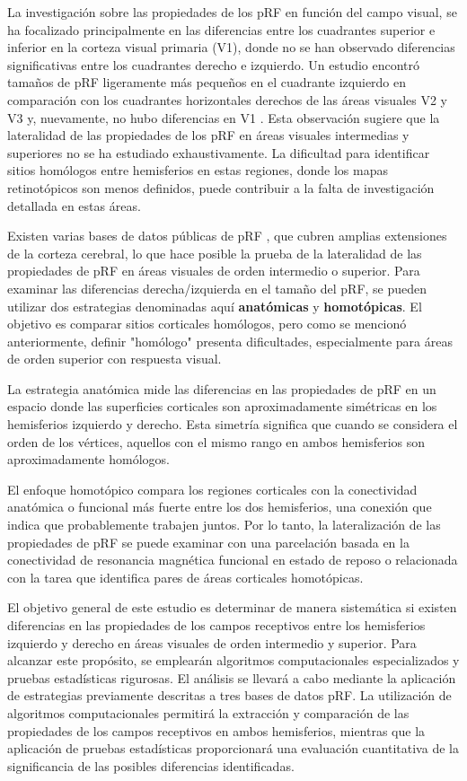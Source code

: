 \documentclass{article}
\begin{document}
	La investigación sobre las propiedades de los pRF en funci\'on del campo visual, se ha focalizado principalmente en las diferencias entre los cuadrantes superior e inferior en la corteza visual primaria (V1), donde no se han observado diferencias significativas entre los cuadrantes derecho e izquierdo. Un estudio encontró tamaños de pRF ligeramente más pequeños en el cuadrante izquierdo en comparación con los cuadrantes horizontales derechos de las \'areas visuales V2 y V3 y, nuevamente, no hubo diferencias en V1 \cite{silva_radial_2018}. Esta observación sugiere que la lateralidad de las propiedades de los pRF en áreas visuales intermedias y superiores no se ha estudiado exhaustivamente. La dificultad para identificar sitios homólogos entre hemisferios en estas regiones, donde los mapas retinotópicos son menos definidos, puede contribuir a la falta de investigación detallada en estas áreas.
			
	Existen varias bases de datos p\'ublicas de pRF \cite{benson_bayesian_2018,himmelberg_cross-dataset_2021}, que cubren amplias extensiones de la corteza cerebral, lo que hace posible la prueba de la lateralidad de las propiedades de pRF en \'areas visuales de orden intermedio o superior. Para examinar las diferencias derecha/izquierda en el tamaño del pRF, se pueden utilizar dos estrategias denominadas aquí \textbf{anatómicas} y \textbf{homotópicas}. El objetivo es comparar sitios corticales homólogos, pero como se mencionó anteriormente, definir "homólogo" presenta dificultades, especialmente para áreas de orden superior con respuesta visual.
	
	La estrategia anatómica mide las diferencias en las propiedades de pRF en un espacio donde las superficies corticales son aproximadamente simétricas en los hemisferios izquierdo y derecho. Esta simetría significa que cuando se considera el orden de los vértices, aquellos con el mismo rango en ambos hemisferios son aproximadamente homólogos.
	
	 El enfoque homotópico compara los regiones corticales con la conectividad anatómica o funcional más fuerte entre los dos hemisferios, una conexión que indica que probablemente trabajen juntos. Por lo tanto, la lateralización de las propiedades de pRF se puede examinar con una parcelación basada en la conectividad de resonancia magnética funcional en estado de reposo o relacionada con la tarea que identifica pares de áreas corticales homotópicas.  
	
	El objetivo general de este estudio es determinar de manera sistemática si existen diferencias en las propiedades de los campos receptivos entre los hemisferios izquierdo y derecho en áreas visuales de orden intermedio y superior. Para alcanzar este propósito, se emplearán algoritmos computacionales especializados y pruebas estadísticas rigurosas. El análisis se llevará a cabo mediante la aplicación de estrategias previamente descritas a tres bases de datos pRF. La utilización de algoritmos computacionales permitirá la extracción y comparación de las propiedades de los campos receptivos en ambos hemisferios, mientras que la aplicación de pruebas estadísticas proporcionará una evaluación cuantitativa de la significancia de las posibles diferencias identificadas.
	
\end{document}
